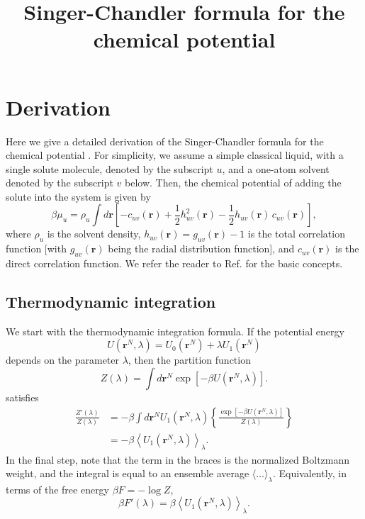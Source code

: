 \documentclass[12pt]{article}
\begin{document}
\newcommand{\vct}[1]{\mathbf{#1}}
\newcommand{\vr}{\vct{r}}
\newcommand{\vrN}{\mathbf{r}^N}
\newcommand{\vrn}{\mathbf{r}^n}
\newcommand{\plam}{\partial_\lambda}



\title{Singer-Chandler formula for the chemical potential}
\date{}
\maketitle



\section{Derivation}

Here we give a detailed derivation of the Singer-Chandler formula
  for the chemical potential \cite{singer}.
For simplicity, we assume a simple classical liquid,
  with a single solute molecule, denoted by the subscript $u$,
  and a one-atom solvent denoted by the subscript $v$ below.
Then, the chemical potential of adding the solute into
  the system is given by
%
\begin{equation}
\beta \mu_u
  =
  \rho_u \int d\vr
  \left[
    - c_{uv}(\vr)
    + \frac{1}{2} h_{uv}^2(\vr)
    - \frac{1}{2} h_{uv}(\vr) \, c_{uv}(\vr)
  \right],
  \label{eq:singer}
\end{equation}
%
where $\rho_u$ is the solvent density,
  $h_{uv}(\vr) = g_{uv}(\vr) - 1$ is the total correlation function
  [with $g_{uv}(\vr)$ being the radial distribution function],
and $c_{uv}(\vr)$ is the direct correlation function.
We refer the reader to Ref. \cite{hansen}
  for the basic concepts.
%



\subsection{Thermodynamic integration}

We start with the thermodynamic integration formula.
If the potential energy
\[
  U(\vrN, \lambda) = U_0(\vrN) + \lambda U_1(\vrN)
\]
depends on the parameter $\lambda$,
then the partition function
\[
  Z(\lambda) = \int d\vrN \exp[-\beta U(\vrN, \lambda)].
\]
satisfies
\begin{align*}
  \frac{ Z'(\lambda) }{Z(\lambda)}
  &=
    -\beta \int d\vrN U_1(\vrN, \lambda)
    \left\{
      \frac{ \exp
             \left[
             -\beta U(\vrN, \lambda)
             \right]}
      { Z(\lambda) }
    \right\} \\
  &=
    -\beta
    \left\langle
      U_1(\vrN, \lambda)
    \right\rangle_\lambda.
\end{align*}
In the final step, note that the term in the braces
  is the normalized Boltzmann weight,
  and the integral is equal to an ensemble average
  $\langle \dots \rangle_\lambda$.
%
Equivalently, in terms of the free energy $\beta F = -\log Z$,
\begin{equation}
  \beta F'(\lambda)
  = \beta
    \left\langle
      U_1(\vrN, \lambda)
    \right\rangle_\lambda.
\end{equation}
\end{document}
